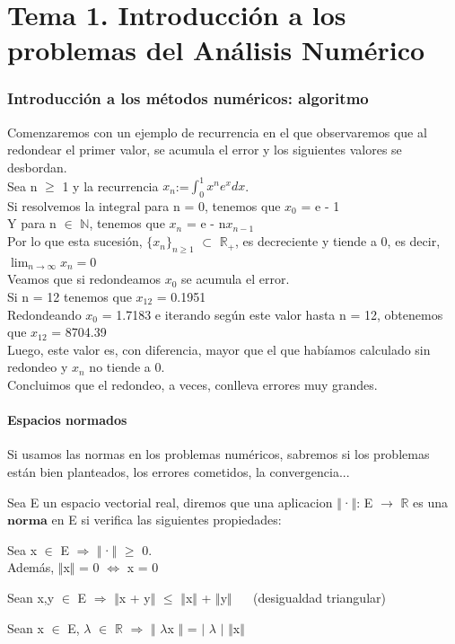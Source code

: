 \part{Tema 1. Introducción a los problemas del Análisis Numérico}

\section{Introducción a los métodos numéricos: algoritmo}
Comenzaremos con un ejemplo de recurrencia en el que observaremos que al redondear el primer valor, se acumula el error y los siguientes valores se desbordan.\\
Sea n $\geq$ 1 y la recurrencia $x_{n}$:=$\int_{0}^{1} x^{n}e^{x}dx$.\\
Si resolvemos la integral para n = 0, tenemos que $x_{0}$ = e - 1\\
Y para n $\in$ $\mathbb{N}$, tenemos que $x_{n}$ = e - n$x_{n-1}$\\
Por lo que esta sucesión, $\lbrace x_{n} \rbrace_{n\geq1}$ $\subset$ $\mathbb{R_{+}}$, es decreciente y tiende a 0, es decir, $ \lim_{n \to \infty} x_{n} = 0 $ \\
Veamos que si redondeamos $x_{0}$ se acumula el error.\\
Si n = 12 tenemos que $x_{12}$ = 0.1951\\
Redondeando $x_{0}$ = 1.7183 e iterando según este valor hasta n = 12, obtenemos que $x_{12}$ = 8704.39\\
Luego, este valor es, con diferencia, mayor que el que habíamos calculado sin redondeo y $x_{n}$ no tiende a 0.\\
Concluimos que el redondeo, a veces, conlleva errores muy grandes.

\subsection{Espacios normados}
Si usamos las normas en los problemas numéricos, sabremos si los problemas están bien planteados, los errores cometidos, la convergencia...\\

\begin{ndef}[Norma]
Sea E un espacio vectorial real, diremos que una aplicacion $\Vert$·$\Vert$: E $\rightarrow$ $\mathbb{R}$ es una $\textbf{norma}$ en E si verifica las siguientes propiedades:
	\begin{nlist}
	\item Sea x $\in$ E $\Rightarrow$ $\Vert$·$\Vert$ $\geq$ 0.\\
	Además, $\Vert$x$\Vert$ = 0 $\Leftrightarrow$ x = 0
	\item Sean x,y $\in$ E $\Rightarrow$ $\Vert$x + y$\Vert$ $\leq$ $\Vert$x$\Vert$ + $\Vert$y$\Vert$ $\quad$ (desigualdad triangular)
	\item Sean x $\in$ E, $\lambda$ $\in$ $\mathbb{R}$ $\Rightarrow$ $\Vert$ $	\lambda$x $\Vert$ = $\vert$ $\lambda$ $\vert$ $\Vert$x$\Vert$
	\end{nlist}
\end{ndef}

